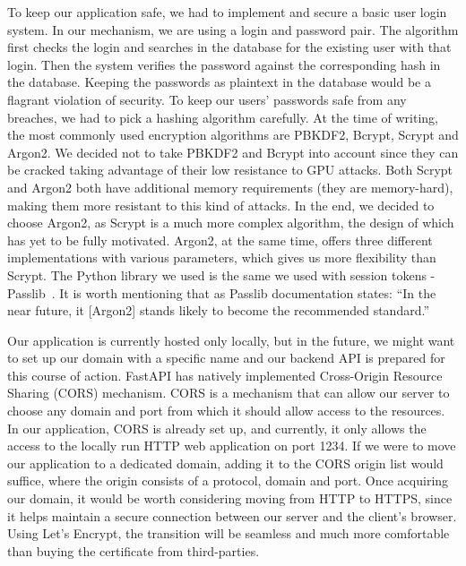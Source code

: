 To keep our application safe, we had to implement and secure a basic user login system. In our mechanism, we are using a login and password pair. The algorithm first checks the login and searches in the database for the existing user with that login. Then the system verifies the password against the corresponding hash in the database. Keeping the passwords as plaintext in the database would be a flagrant violation of security. To keep our users' passwords safe from any breaches, we had to pick a hashing algorithm carefully. At the time of writing, the most commonly used encryption algorithms are PBKDF2, Bcrypt, Scrypt and Argon2. We decided not to take PBKDF2 and Bcrypt into account since they can be cracked taking advantage of their low resistance to GPU attacks. Both Scrypt and Argon2 both have additional memory requirements (they are memory-hard), making them more resistant to this kind of attacks. In the end, we decided to choose Argon2, as Scrypt is a much more complex algorithm, the design of which has yet to be fully motivated. Argon2, at the same time, offers three different implementations with various parameters, which gives us more flexibility than Scrypt. The Python library we used is the same we used with session tokens - Passlib~\cite{passlib}. It is worth mentioning that as Passlib documentation states: ``In the near future, it [Argon2] stands likely to become the recommended standard.''~\cite{passlib_argon2}


Our application is currently hosted only locally, but in the future, we might want to set up our domain with a specific name and our backend API is prepared for this course of action. FastAPI has natively implemented Cross-Origin Resource Sharing (CORS) mechanism. CORS  is a mechanism that can allow our server to choose any domain and port from which it should allow access to the resources. In our application, CORS is already set up, and currently, it only allows the access to the locally run HTTP web application on port 1234. If we were to move our application to a dedicated domain, adding it to the CORS origin list would suffice, where the origin consists of a protocol, domain and port. Once acquiring our domain, it would be worth considering moving from HTTP to HTTPS, since it helps maintain a secure connection between our server and the client's browser. Using Let's Encrypt, the transition will be seamless and much more comfortable than buying the certificate from third-parties. 


